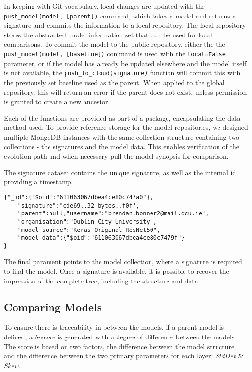In keeping with Git vocabulary, local changes are updated with the \verb|push_model(model, [parent])| command, which takes a model and returns a signature and commits the information to a local repository. The local repository stores the abstracted model information set that can be used for local comparisons.
To commit the model to the public repository, either the the \verb|push_model(model, [baseline])| command is used with the \verb|local=False| parameter, or if the model has already be updated elsewhere and the model itself is not available, the \verb|push_to_cloud(signature)| function will commit this with the previously set baseline used as the parent. When applied to the global repository, this will return an error if the parent does not exist, unless permission is granted to create a new ancestor.

Each of the functions are provided as part of a package, encapsulating the data method used. To provide reference storage for the model repositories, we designed multiple MongoDB instances with the same collection structure containing two collections - the signatures and the model data. This enables verification of the evolution path and when necessary pull the model synopsis for comparison.

The signature dataset contains the unique signature, as well as the internal id providing a timestamp. 

\begin{lstlisting}
{"_id":{"$oid":"611063067dbea4ce80c747a0"},
    "signature":"ede69..32 bytes..f0f",
    "parent":null,"username":"brendan.bonner2@mail.dcu.ie",
    "organisation":"Dublin City University",
    "model_source":"Keras Original ResNet50",
    "model_data":{"$oid":"611063067dbea4ce80c7479f"}
}
\end{lstlisting}

The final parament points to the model collection, where a signature is required to find the model. Once a signature is available, it is possible to recover the impression of the complete tree, including the structure and data.

\subsection{Comparing Models}
To ensure there is traceability in between the models, if a parent model is defined, a \textit{b-score} is generated with a degree of difference between the models. The score is based on two factors, the difference between the model structure, and the difference between the two primary parameters for each layer: \textit{StdDev} \& \textit{Skew}. 

